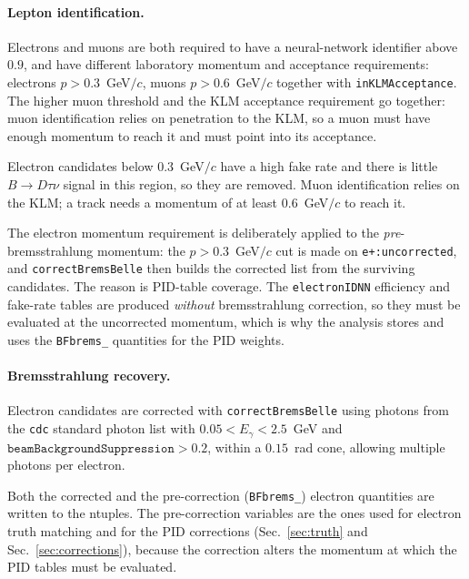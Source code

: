 \paragraph{Lepton identification.}
Electrons and muons are both required to have a neural-network identifier
above $0.9$, and have different laboratory momentum and acceptance
requirements: electrons $p > 0.3$~GeV$/c$, muons $p > 0.6$~GeV$/c$ together
with \texttt{inKLMAcceptance}.
The higher muon threshold and the KLM acceptance requirement go together:
muon identification relies on penetration to the KLM, so a muon must have
enough momentum to reach it and must point into its acceptance.


Electron candidates below $0.3$~GeV$/c$ have a high fake
rate and there is little $B\to D\tau\nu$ signal in this region, so they are removed.
Muon identification relies on the KLM; a track needs a momentum of
at least $0.6$~GeV$/c$ to
reach it.

The electron momentum requirement is deliberately applied to the
\emph{pre}-bremsstrahlung momentum: the $p > 0.3$~GeV$/c$ cut is made on
\texttt{e+:uncorrected}, and \texttt{correctBremsBelle} then builds the
corrected list from the surviving candidates.
The reason is PID-table coverage.
The \texttt{electronIDNN} efficiency and fake-rate tables are
produced \emph{without} bremsstrahlung correction, so they must be evaluated
at the uncorrected momentum, which is why the analysis stores and uses the
\texttt{BFbrems\_} quantities for the PID weights.





\paragraph{Bremsstrahlung recovery.}
Electron candidates are corrected with \texttt{correctBremsBelle} using
photons from the \texttt{cdc} standard photon list with
$0.05 < E_{\gamma} < 2.5$~GeV and $\texttt{beamBackgroundSuppression} > 0.2$,
within a $0.15$~rad cone, allowing multiple photons per electron.


Both the corrected and the pre-correction (\texttt{BFbrems\_}) electron
quantities are written to the ntuples.
The pre-correction variables are the ones used for electron truth matching and
for the PID corrections (Sec.~\ref{sec:truth} and
Sec.~\ref{sec:corrections}), because the correction alters the momentum at
which the PID tables must be evaluated.

